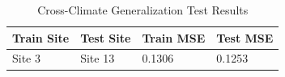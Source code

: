 \begin{table}[H]
\caption{Cross-Climate Generalization Test Results}
\begin{center}
\begin{tabular}{l l l l}
\toprule
\textbf{Train Site} & \textbf{Test Site} & \textbf{Train MSE} & \textbf{Test MSE} \\
\midrule
Site 3 & Site 13 & 0.1306 & 0.1253 \\
\bottomrule
\end{tabular}
\end{center}
\end{table}

